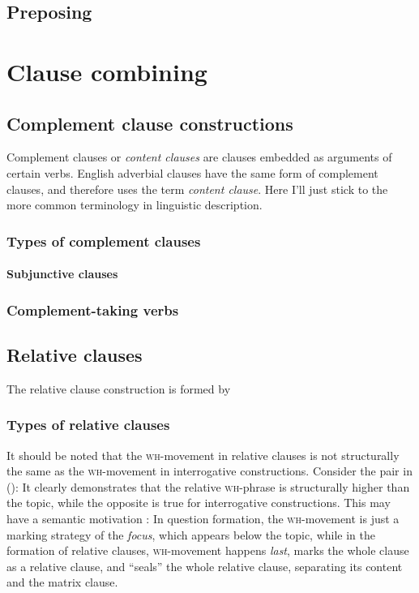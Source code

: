 \documentclass[UTF8, a4paper, oneside, scheme=plain]{ctexrep}
\newcommand*{\citepage}[1]{pp.~{#1}}
\newcommand*{\term}[1]{\emph{#1}}
\newcommand{\corpuscat}[1]{\textsc{#1}}
\begin{document}
\section{Preposing}\label{sec:information.preposing}


\chapter{Clause combining}\label{chap:clause-combining}

\section{Complement clause constructions}\label{chap:complement-clause}

Complement clauses or \term{content clauses} \citep{cgel} are clauses embedded as arguments of certain verbs.
English adverbial clauses have the same form of complement clauses,
and therefore \citet{cgel} uses the term \term{content clause}.
Here I'll just stick to the more common terminology in linguistic description.

\subsection{Types of complement clauses}

\subsubsection{Subjunctive clauses}\label{sec:complement.subjunctive}

\subsection{Complement-taking verbs}

\section{Relative clauses}\label{sec:relative-clause}

The relative clause construction is formed by 

\subsection{Types of relative clauses}

It should be noted that the \corpuscat{wh}-movement in relative clauses 
is not structurally the same as the \corpuscat{wh}-movement in interrogative constructions.
Consider the pair in ():
It clearly demonstrates that the relative \corpuscat{wh}-phrase 
is structurally higher than the topic,
while the opposite is true for interrogative constructions.
This may have a semantic motivation \citet[\citepage{330}]{radford2009analysing}:
In question formation, the \corpuscat{wh}-movement is just a marking strategy of the \emph{focus},
which appears below the topic,
while in the formation of relative clauses,
\corpuscat{wh}-movement happens \emph{last},
marks the whole clause as a relative clause, 
and ``seals'' the whole relative clause,
separating its content and the matrix clause.
\end{document}
